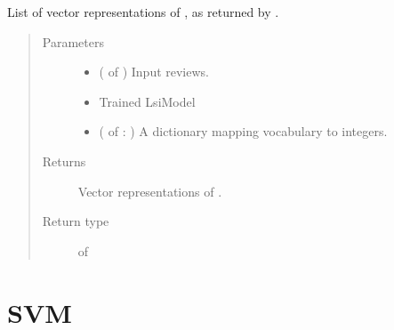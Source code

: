 \documentclass[letterpaper,10pt,english]{sphinxmanual}
\begin{document}

\begin{fulllineitems}
\label{\detokenize{learning:loacore.learning.lsi.reviews_2_vec}}
List of vector representations of , as returned by {\hyperref[\detokenize{learning:loacore.learning.lsi.review_2_vec}]{}}.
\begin{quote}\begin{description}
\item[{Parameters}] \leavevmode\begin{itemize}
\item {} 
 ( of {\hyperref[\detokenize{classes:loacore.classes.classes.Review}]{}}) \textendash{} Input reviews.

\item {} 
 \textendash{} Trained LsiModel

\item {} 
 ( of  : ) \textendash{} A dictionary mapping vocabulary to integers.

\end{itemize}

\item[{Returns}] \leavevmode
Vector representations of .

\item[{Return type}] \leavevmode

 of 


\end{description}\end{quote}

\end{fulllineitems}



\section{SVM}
\label{\detokenize{learning:module-loacore.learning.svm}}\label{\detokenize{learning:svm}}
\end{document}
